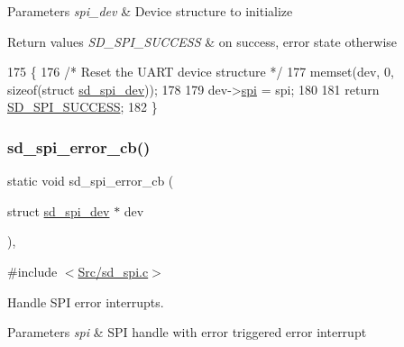 \begin{DoxyParams}{Parameters}
{\em spi\+\_\+dev} & Device structure to initialize \\
\hline
\end{DoxyParams}

\begin{DoxyRetVals}{Return values}
{\em S\+D\+\_\+\+S\+P\+I\+\_\+\+S\+U\+C\+C\+E\+SS} & on success, error state otherwise \\
\hline
\end{DoxyRetVals}

\begin{DoxyCode}
175 \{
176     \textcolor{comment}{/* Reset the UART device structure */}
177     memset(dev, 0, \textcolor{keyword}{sizeof}(\textcolor{keyword}{struct} \mbox{\hyperlink{structsd__spi__dev}{sd\_spi\_dev}}));
178     
179     dev->\mbox{\hyperlink{structsd__spi__dev_a06909907ded69cbc00db1f401a90f8ee}{spi}} = spi;
180   
181     \textcolor{keywordflow}{return} \mbox{\hyperlink{group___s_d___s_p_i___types_gga9ae67f7089a8196e9c6b74b8a6708c2ea109567296b93a03b1949407009750681}{SD\_SPI\_SUCCESS}};
182 \}
\end{DoxyCode}
\mbox{\label{group___s_d___s_p_i___functions_ga3515d67aa70e65e562b55011aface3b9}} 
\subsubsection{\texorpdfstring{sd\+\_\+spi\+\_\+error\+\_\+cb()}{sd\_spi\_error\_cb()}}
{\footnotesize\ttfamily static void sd\+\_\+spi\+\_\+error\+\_\+cb (\begin{DoxyParamCaption}\item[{struct \mbox{\hyperlink{structsd__spi__dev}{sd\+\_\+spi\+\_\+dev}} $\ast$}]{dev }\end{DoxyParamCaption})\hspace{0.3cm}{\ttfamily [inline]}, {\ttfamily [static]}}



{\ttfamily \#include $<$\mbox{\hyperlink{sd__spi_8c}{Src/sd\+\_\+spi.\+c}}$>$}



Handle S\+PI error interrupts. 


\begin{DoxyParams}{Parameters}
{\em spi} & S\+PI handle with error triggered error interrupt \\
\hline
\end{DoxyParams}

